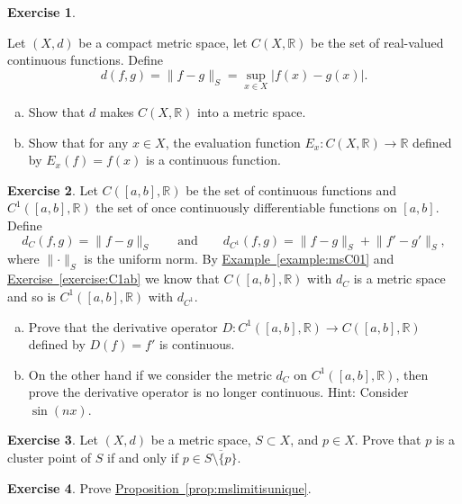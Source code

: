 \documentclass[12pt,openany]{book}
\newcommand{\snorm}[1]{\lVert {#1} \rVert}
\newcommand{\abs}[1]{\left\lvert {#1} \right\rvert}
\newcommand{\R}{{\mathbb{R}}}
\theoremstyle{plain}
\theoremstyle{remark}
\theoremstyle{definition}
\newenvironment{exbox}{%
    \def\FrameCommand{\vrule width 1pt \relax\hspace {10pt}}%
    \MakeFramed {\advance \hsize -\width \FrameRestore }%
}{%
    \endMakeFramed
}
\newenvironment{exparts}{%
    \leavevmode\begin{enumerate}[a),noitemsep,topsep=0pt,parsep=0pt,partopsep=0pt]
}{%
    \end{enumerate}
}
\theoremstyle{exercise}
\newtheorem{exercise}{Exercise}[section]
\theoremstyle{example}
\newcommand{\exerciseref}[1]{\hyperref[#1]{Exercise~\ref*{#1}}}
\newcommand{\exampleref}[1]{\hyperref[#1]{Example~\ref*{#1}}}
\newcommand{\propref}[1]{\hyperref[#1]{Proposition~\ref*{#1}}}
\begin{document}
\begin{exbox}
\begin{exercise}
\begin{samepage}
Let $(X,d)$ be a compact metric space, let $C(X,\R)$ be the set
of real-valued continuous functions.  Define
\begin{equation*}
d(f,g) = \snorm{f-g}_S = \sup_{x \in X} \abs{f(x)-g(x)} .
\end{equation*}
\begin{exparts}
\item
Show that $d$ makes $C(X,\R)$ into a metric space.
\item
Show that for any $x \in X$, the evaluation function
$E_x \colon C(X,\R) \to \R$ defined by $E_x(f) = f(x)$
is a continuous function.
\end{exparts}
\end{samepage}
\end{exercise}

\begin{samepage}
\begin{exercise}
Let $C([a,b],\R)$ be the set of continuous functions and
$C^1([a,b],\R)$ the set of once continuously differentiable
functions on $[a,b]$.
Define
\begin{equation*}
d_{C}(f,g) = \snorm{f-g}_S
\qquad \text{and} \qquad
d_{C^1}(f,g) = \snorm{f-g}_S + \snorm{f'-g'}_S,
\end{equation*}
where $\snorm{\cdot}_S$ is the uniform norm.
By \exampleref{example:msC01} and \exerciseref{exercise:C1ab} we know that
$C([a,b],\R)$ with $d_C$ is a metric space and
so is
$C^1([a,b],\R)$ with $d_{C^1}$.
\begin{exparts}
\item
Prove that the derivative operator $D \colon 
C^1([a,b],\R) \to C([a,b],\R)$ defined by
$D(f) = f'$ is continuous.
\item
On the other hand if we consider the metric $d_C$ on $C^1([a,b],\R)$,
then prove the derivative operator is no longer continuous.  Hint: Consider
$\sin(n x)$.
\end{exparts}
\end{exercise}
\end{samepage}

\begin{exercise}
Let $(X,d)$ be a metric space, $S \subset X$, and $p \in X$.  Prove that
$p$ is a cluster point of $S$ if and only if $p \in \overline{S \setminus \{
p \}}$.
\end{exercise}

\begin{exercise}
Prove \propref{prop:mslimitisunique}.
\end{exercise}


\end{exbox}
\end{document}
